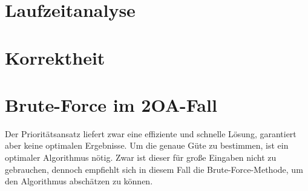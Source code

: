 \documentclass[german,version-2019-11]{uzl-thesis}
\begin{document}
\section{Laufzeitanalyse}

\section{Korrektheit}


\section{Brute-Force im 2OA-Fall}

Der Prioritätsansatz liefert zwar eine effiziente und schnelle Lösung, garantiert aber keine optimalen Ergebnisse. Um die genaue Güte zu bestimmen, ist ein optimaler Algorithmus nötig. Zwar ist dieser für große Eingaben nicht zu gebrauchen, dennoch empfiehlt sich in diesem Fall die Brute-Force-Methode, um den Algorithmus abschätzen zu können. 
\end{document}
